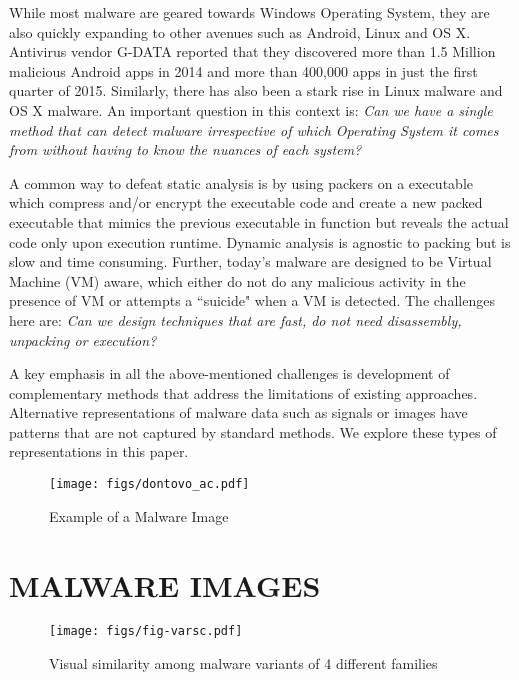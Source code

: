 \documentclass[journal]{IEEEtran}
\begin{document}
 While most malware are geared towards Windows Operating System, they are also quickly expanding to other avenues such as Android, Linux and OS X.
Antivirus vendor G-DATA reported that they discovered more than 1.5 Million malicious Android apps in 2014 and more than 400,000 apps in just the first quarter of 2015. 
Similarly, there has also been a stark rise in Linux malware and OS X malware. 
An important question in this context is: \emph{Can we have a single method that can detect malware irrespective of which Operating System it comes from without having to know the nuances of each system?}

 A common way to defeat static analysis is by using packers on a executable which compress and/or encrypt the executable code and create a new packed executable that mimics the previous executable in function but reveals the actual code only upon execution runtime.
Dynamic analysis is agnostic to packing but is slow and time consuming.
Further, today's malware are designed to be Virtual Machine (VM) aware, which either do not do any malicious activity in the presence of VM or attempts a ``suicide" when a VM is detected. 
The challenges here are: \emph{Can we design techniques that are fast, do not need disassembly, unpacking or execution?}

 A key emphasis in all the above-mentioned challenges is development of complementary methods that address the limitations of existing approaches.
Alternative representations of malware data such as signals or images have patterns that are not captured by standard methods.
We explore these types of representations in this paper.


\begin{figure}[h]
\centering
{\texttt{[image: figs/dontovo\_ac.pdf]}}
\caption{Example of a Malware Image}
\label{dontovo}
\vspace{-10pt}
\end{figure}

\section*{MALWARE IMAGES}

\begin{figure*}[t]
\centering
{\texttt{[image: figs/fig-varsc.pdf]}}
\vspace{-10pt}
\caption{Visual similarity among malware variants of 4 different families}
\label{fig2}
\vspace{-10pt}
\end{figure*}
\end{document}

